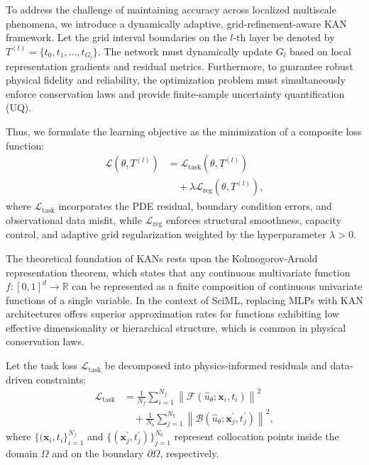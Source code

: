 \documentclass[10pt,twocolumn]{article}
\begin{document}
To address the challenge of maintaining accuracy across localized multiscale phenomena, we introduce a dynamically adaptive, grid-refinement-aware KAN framework. Let the grid interval boundaries on the $l$-th layer be denoted by $T^{(l)} = \{t_0, t_1, \dots, t_{G_l}\}$. The network must dynamically update $G_l$ based on local representation gradients and residual metrics. Furthermore, to guarantee robust physical fidelity and reliability, the optimization problem must simultaneously enforce conservation laws and provide finite-sample uncertainty quantification (UQ). 

Thus, we formulate the learning objective as the minimization of a composite loss function:
\begin{equation}
\begin{aligned}
\mathcal{L}(\theta, T^{(l)}) &= \mathcal{L}_{\text{task}}(\theta, T^{(l)}) \\
&\quad + \lambda \mathcal{L}_{\text{reg}}(\theta, T^{(l)}),
\end{aligned}
\end{equation}
where $\mathcal{L}_{\text{task}}$ incorporates the PDE residual, boundary condition errors, and observational data misfit, while $\mathcal{L}_{\text{reg}}$ enforces structural smoothness, capacity control, and adaptive grid regularization weighted by the hyperparameter $\lambda > 0$.



The theoretical foundation of KANs rests upon the Kolmogorov-Arnold representation theorem, which states that any continuous multivariate function $f: [0, 1]^d \to \mathbb{R}$ can be represented as a finite composition of continuous univariate functions of a single variable. In the context of SciML, replacing MLPs with KAN architectures offers superior approximation rates for functions exhibiting low effective dimensionality or hierarchical structure, which is common in physical conservation laws.

Let the task loss $\mathcal{L}_{\text{task}}$ be decomposed into physics-informed residuals and data-driven constraints:
\begin{equation}
\begin{aligned}
\mathcal{L}_{\text{task}} &= \frac{1}{N_f} \sum_{i=1}^{N_f} \left\| \mathcal{F}(\hat{u}_{\theta}; \mathbf{x}_i, t_i) \right\|^2 \\
&\quad + \frac{1}{N_b} \sum_{j=1}^{N_b} \left\| \mathcal{B}(\hat{u}_{\theta}; \mathbf{x}_j^\prime, t_j^\prime) \right\|^2,
\end{aligned}
\end{equation}
where $\{(\mathbf{x}_i, t_i\}_{i=1}^{N_f}$ and $\{(\mathbf{x}_j^\prime, t_j^\prime)\}_{j=1}^{N_b}$ represent collocation points inside the domain $\Omega$ and on the boundary $\partial\Omega$, respectively.
\end{document}
